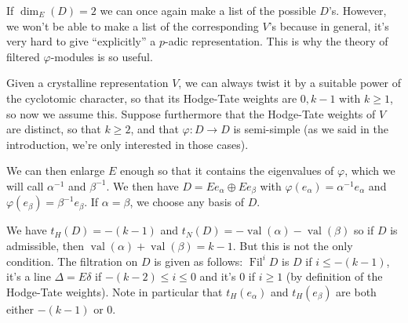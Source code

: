 \documentclass[11pt]{amsart}
\def\ra{\rightarrow}
\def\on{\operatorname}
\begin{document}
If $\dim_E(D)=2$  we can once again make a list of 
the possible $D$'s. However, we won't be able to make a list of the 
corresponding $V$'s because in general, it's very hard to give 
``explicitly'' a $p$-adic representation. This is why the theory of 
filtered $\varphi$-modules is so useful. 
 
Given a crystalline representation $V$, we can always twist it by a 
suitable power of the cyclotomic character, so that its Hodge-Tate 
weights are $0,k-1$ with $k \geq 1$, so now we assume this.  
Suppose furthermore that the Hodge-Tate weights of $V$ are distinct, 
so that $k \geq 2$, and that 
$\varphi:D \ra D$ is semi-simple  
(as we said in the introduction, we're 
only interested in those cases).  
 
We can then enlarge $E$ enough so that it contains  
the eigenvalues of $\varphi$, 
which we will call $\alpha^{-1}$ and 
$\beta^{-1}$. We then have $D=E e_\alpha \oplus E e_\beta$ with 
$\varphi(e_\alpha)=\alpha^{-1} e_\alpha$ and $\varphi(e_\beta) = \beta^{-1} 
e_{\beta}$. If $\alpha=\beta$, we choose any basis of $D$.

We have $t_H(D)=-(k-1)$ and $t_N(D)=-\on{val}(\alpha) - 
\on{val}(\beta)$ so if $D$ is admissible, then 
$\on{val}(\alpha)+\on{val}(\beta)=k-1$. But this is not the only 
condition. The filtration on $D$ is given as follows: $\on{Fil}^i D$ 
is $D$ if $i \leq -(k-1)$, it's a line $\Delta = E \delta$  
if $-(k-2) \leq i \leq 
0$ and it's $0$ if $i\geq 1$ (by definition of the Hodge-Tate 
weights). Note in particular that $t_H(e_\alpha)$ and $t_H(e_\beta)$ 
are both either $-(k-1)$ or $0$. 
 
\end{document}
